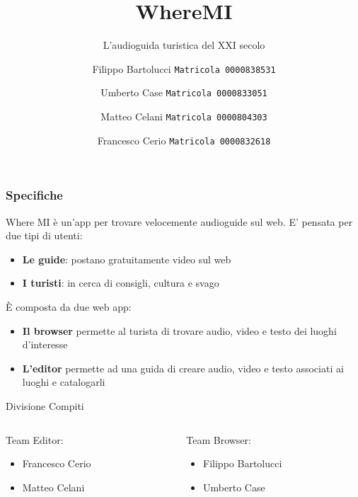\documentclass{beamer}
\title{WhereMI}
\subtitle{L'audioguida turistica del XXI secolo}
\author{
  Filippo Bartolucci
  \texttt{Matricola 0000838531}\\
  \and
  Umberto Case
  \texttt{Matricola 0000833051}\\
    \and
  Matteo Celani
  \texttt{Matricola 0000804303}\\
    \and
  Francesco Cerio
  \texttt{Matricola 0000832618}
 }
\institute{Università di Bologna}
\date{}
\begin{document}
\begin{frame}
\titlepage
\end{frame}

\begin{frame}
\frametitle{Specifiche}
Where MI è un'app per trovare velocemente audioguide sul web. E' pensata per due tipi di utenti:
\begin{itemize}
  \item \textbf{Le guide}: postano gratuitamente video sul web
  \item \textbf{I turisti}: in cerca di consigli, cultura e svago
\end{itemize}
\vspace{0.2cm}
È composta da due web app:
\begin{itemize}
  \item \textbf{Il browser} permette al turista di trovare audio, video e testo dei luoghi d'interesse
  \item \textbf{L'editor} permette ad una guida di creare audio, video e testo associati ai luoghi e catalogarli
\end{itemize}
\vspace{0.2cm}
\centering Divisione Compiti
\vspace{0.2cm}
  \begin{columns}
    \begin{column}{.48\textwidth} %
    Team Editor:
 \begin{itemize}
  \item Francesco Cerio
  \item Matteo Celani
\end{itemize}
    \end{column}
    \hfill
    \begin{column}{.48 \textwidth}
    Team Browser:
  \begin{itemize}
  \item Filippo Bartolucci
  \item Umberto Case
\end{itemize}
    \end{column}
  \end{columns}
\end{frame}
\end{document}
